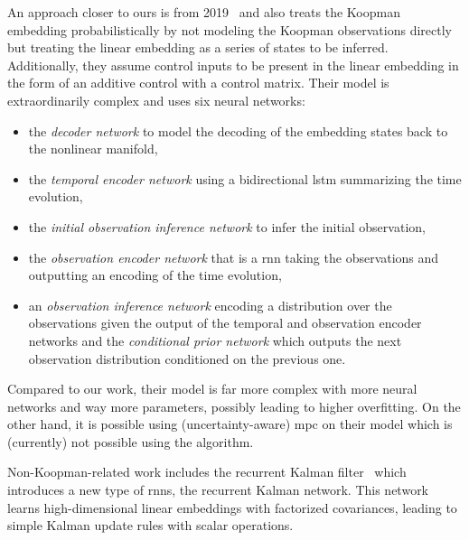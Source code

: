 An approach closer to ours is from 2019~\cite{mortonDeepVariationalKoopman2019a} and also treats the Koopman embedding probabilistically by not modeling the Koopman observations directly but treating the linear embedding as a series of states to be inferred. Additionally, they assume control inputs to be present in the linear embedding in the form of an additive control with a control matrix. Their model is extraordinarily complex and uses six neural networks:
\begin{itemize}
	\item the \emph{decoder network} to model the decoding of the embedding states back to the nonlinear manifold,
	\item the \emph{temporal encoder network} using a bidirectional \ac{lstm} summarizing the time evolution,
	\item the \emph{initial observation inference network} to infer the initial observation,
	\item the \emph{observation encoder network} that is a \ac{rnn} taking the observations and outputting an encoding of the time evolution,
	\item an \emph{observation inference network} encoding a distribution over the observations given the output of the temporal and observation encoder networks and
	the \emph{conditional prior network} which outputs the next observation distribution conditioned on the previous one.
\end{itemize}
Compared to our work, their model is far more complex with more neural networks and way more parameters, possibly leading to higher overfitting. On the other hand, it is possible using (uncertainty-aware) \ac{mpc} on their model which is (currently) not possible using the \algname algorithm.

Non-Koopman-related work includes the recurrent Kalman filter~\cite{beckerRecurrentKalmanNetworks2019a} which introduces a new type of \acp{rnn}, the recurrent Kalman network. This network learns high-dimensional linear embeddings with factorized covariances, leading to simple Kalman update rules with scalar operations.

